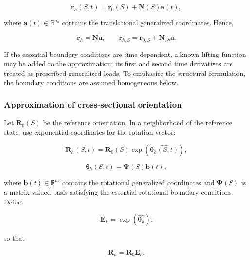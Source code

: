 \begin{equation}
\label{eq:galerkin-2-1}
\mathbf{r}_{h}(S,t) = \mathbf{r}_{0}(S) + \mathbf{N}(S)\mathbf{a}(t),
\end{equation}

where \(\mathbf{a}(t) \in \mathbb{R}^{n_{a}}\) contains the translational generalized coordinates. Hence,

\begin{equation}
\label{eq:galerkin-2-2}
{\dot{\mathbf{r}}}_{h} = \mathbf{N}\dot{\mathbf{a}},\quad\quad\mathbf{r}_{h,S} = \mathbf{r}_{0,S} + \mathbf{N}_{,S}\mathbf{a}.
\end{equation}

If the essential boundary conditions are time dependent, a known lifting function may be added to the approximation; its first and second time derivatives are treated as prescribed generalized loads. To emphasize the structural formulation, the boundary conditions are assumed homogeneous below.

\subsubsection{Approximation of cross-sectional orientation}\label{sec:galerkin-2-2-2}

Let \(\mathbf{R}_{0}(S)\) be the reference orientation. In a neighborhood of the reference state, use exponential coordinates for the rotation vector:

\begin{equation}
\label{eq:galerkin-2-3}
\mathbf{R}_{h}(S,t) = \mathbf{R}_{0}(S)\exp\left( \widehat{\bm{\theta}_{h}(S,t)} \right),
\end{equation}

\begin{equation}
\label{eq:galerkin-2-4}
\bm{\theta}_{h}(S,t) = \bm{\Psi}(S)\mathbf{b}(t),
\end{equation}

where \(\mathbf{b}(t) \in \mathbb{R}^{n_{b}}\) contains the rotational generalized coordinates and \(\bm{\Psi}(S)\) is a matrix-valued basis satisfying the essential rotational boundary conditions. Define

\begin{equation}
\label{eq:galerkin-2-5}
\mathbf{E}_{h} = \exp\left( \widehat{\bm{\theta}_{h}} \right).
\end{equation}

so that

\begin{equation}
\label{eq:galerkin-2-6}
\mathbf{R}_{h} = \mathbf{R}_{0}\mathbf{E}_{h}.
\end{equation}

